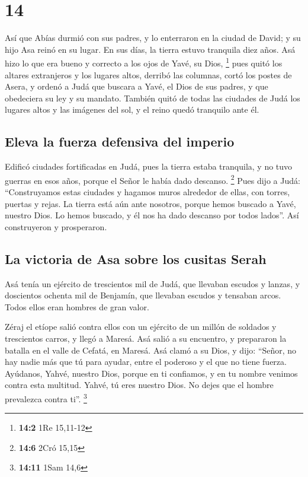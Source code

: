 \hypertarget{section-13}{%
\section{14}\label{section-13}}

 Así que Abías durmió con sus padres, y lo enterraron en
la ciudad de David; y su hijo Asa reinó en su lugar. En sus días, la
tierra estuvo tranquila diez años.  Asá hizo lo que era
bueno y correcto a los ojos de Yavé, su Dios, \footnote{\textbf{14:2}
  1Re 15,11-12}  pues quitó los altares extranjeros y los
lugares altos, derribó las columnas, cortó los postes de Asera,
 y ordenó a Judá que buscara a Yavé, el Dios de sus
padres, y que obedeciera su ley y su mandato.  También
quitó de todas las ciudades de Judá los lugares altos y las imágenes del
sol, y el reino quedó tranquilo ante él.

\hypertarget{eleva-la-fuerza-defensiva-del-imperio}{%
\subsection{Eleva la fuerza defensiva del
imperio}\label{eleva-la-fuerza-defensiva-del-imperio}}

 Edificó ciudades fortificadas en Judá, pues la tierra
estaba tranquila, y no tuvo guerras en esos años, porque el Señor le
había dado descanso. \footnote{\textbf{14:6} 2Cró 15,15} 
Pues dijo a Judá: ``Construyamos estas ciudades y hagamos muros
alrededor de ellas, con torres, puertas y rejas. La tierra está aún ante
nosotros, porque hemos buscado a Yavé, nuestro Dios. Lo hemos buscado, y
él nos ha dado descanso por todos lados''. Así construyeron y
prosperaron.

\hypertarget{la-victoria-de-asa-sobre-los-cusitas-serah}{%
\subsection{La victoria de Asa sobre los cusitas
Serah}\label{la-victoria-de-asa-sobre-los-cusitas-serah}}

 Asá tenía un ejército de trescientos mil de Judá, que
llevaban escudos y lanzas, y doscientos ochenta mil de Benjamín, que
llevaban escudos y tensaban arcos. Todos ellos eran hombres de gran
valor.

 Zéraj el etíope salió contra ellos con un ejército de un
millón de soldados y trescientos carros, y llegó a Maresá.
 Asá salió a su encuentro, y prepararon la batalla en el
valle de Cefatá, en Maresá.  Asá clamó a su Dios, y dijo:
``Señor, no hay nadie más que tú para ayudar, entre el poderoso y el que
no tiene fuerza. Ayúdanos, Yahvé, nuestro Dios, porque en ti confiamos,
y en tu nombre venimos contra esta multitud. Yahvé, tú eres nuestro
Dios. No dejes que el hombre prevalezca contra ti''. \footnote{\textbf{14:11}
  1Sam 14,6}

